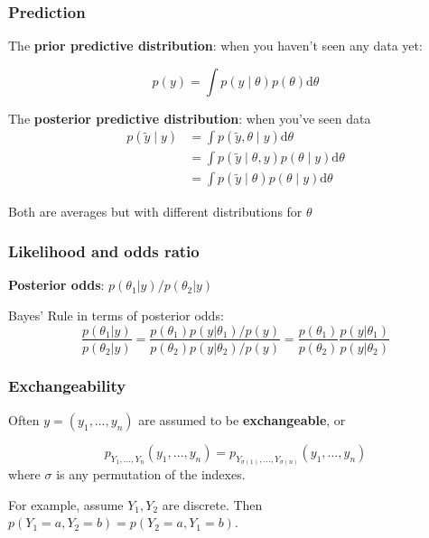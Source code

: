 \documentclass{beamer}
\begin{document}
\begin{frame}
\frametitle{Prediction}

The {\bf prior predictive distribution}: when you haven't seen any data yet:

\[
p(y) = \int p(y \mid \theta) p(\theta) \text{d}\theta
\]
\pause

The {\bf posterior predictive distribution}: when you've seen data 
\begin{align*}
p(\tilde{y} \mid y) &= \int p(\tilde{y}, \theta \mid y) \text{d}\theta \\
&= \int p(\tilde{y} \mid \theta, y) p(\theta \mid y) \text{d}\theta \\
&= \int p(\tilde{y} \mid \theta ) p(\theta \mid y) \text{d}\theta \tag{cond. indep.}
\end{align*}

Both are averages but with different distributions for $\theta$

\end{frame}


\begin{frame}
  \frametitle{Likelihood and odds ratio}
{\bf Posterior odds}: $p(\theta_1|y)/p(\theta_2|y)$
\newline

Bayes' Rule in terms of posterior odds:
\[
\frac{p(\theta_1|y)}{p(\theta_2|y)} = \frac{p(\theta_1)
  p(y|\theta_1)/p(y)}{p(\theta_2) p(y|\theta_2)/p(y)} =
\frac{p(\theta_1)}{p(\theta_2)} \frac{p(y|\theta_1)}{p(y|\theta_2)}
\]
\end{frame}

\begin{frame}
\frametitle{Exchangeability}

Often $y = (y_1, \ldots, y_n)$ are assumed to be {\bf exchangeable}, or

\[
p_{Y_1, \ldots, Y_n}(y_1, \ldots, y_n) = p_{Y_{\sigma(1)}, \ldots, Y_{\sigma(n)} }(y_1, \ldots, y_n)
\]
where $\sigma$ is any permutation of the indexes.
\pause
\newline

For example, assume $Y_1, Y_2$ are discrete. Then $p(Y_1 = a, Y_2 = b) = p(Y_2 = a, Y_1=b)$.

\end{frame}
\end{document}
